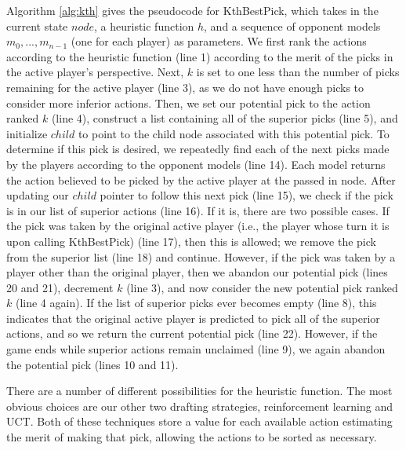\documentclass[letterpaper]{article}
\numberwithin{equation}{section}
\numberwithin{theorem}{section}
\numberwithin{lemma}{section}
\numberwithin{df}{section}
\begin{document}
Algorithm \ref{alg:kth} gives the pseudocode for KthBestPick, which takes in the current state $node$, a heuristic function $h$, and a sequence of opponent models $m_0, ..., m_{n-1}$ (one for each player) as parameters.  We first rank the actions according to the heuristic function (line 1) according to the merit of the picks in the active player's perspective.  Next, $k$ is set to one less than the number of picks remaining for the active player (line 3), as we do not have enough picks to consider more inferior actions.  Then, we set our potential pick to the action ranked $k$ (line 4), construct a list containing all of the superior picks (line 5), and initialize $child$ to point to the child node associated with this potential pick.  To determine if this pick is desired, we repeatedly find each of the next picks made by the players according to the opponent models (line 14).  Each model returns the action believed to be picked by the active player at the passed in node.  After updating our $child$ pointer to follow this next pick (line 15), we check if the pick is in our list of superior actions (line 16).  If it is, there are two possible cases.  If the pick was taken by the original active player (i.e., the player whose turn it is upon calling KthBestPick) (line 17), then this is allowed; we remove the pick from the superior list (line 18) and continue.  However, if the pick was taken by a player other than the original player, then we abandon our potential pick (lines 20 and 21), decrement $k$ (line 3), and now consider the new potential pick ranked $k$ (line 4 again).  If the list of superior picks ever becomes empty (line 8), this indicates that the original active player is predicted to pick all of the superior actions, and so we return the current potential pick (line 22).  However, if the game ends while superior actions remain unclaimed (line 9), we again abandon the potential pick (lines 10 and 11). 

There are a number of different possibilities for the heuristic function.  The most obvious choices are our other two drafting strategies, reinforcement learning and UCT.  Both of these techniques store a value for each available action estimating the merit of making that pick, allowing the actions to be sorted as necessary.
\end{document}
